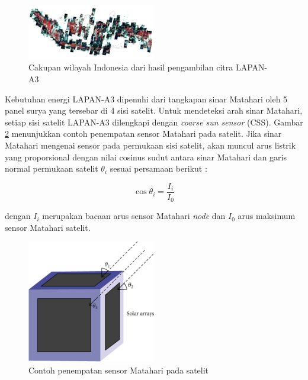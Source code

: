 \begin{figure}[H]
\setlength{}
\begin{center}
\includegraphics[width=0.5\textwidth]{fig/coverage.png}
	\caption[Cakupan wilayah Indonesia dari hasil pengambilan citra LAPAN-A3]{Cakupan wilayah Indonesia dari hasil pengambilan citra LAPAN-A3~\cite{hakim2018}}
\label{fig:coverage}
\end{center}
\end{figure}

Kebutuhan energi LAPAN-A3 dipenuhi dari tangkapan sinar Matahari oleh 5 panel
surya yang tersebar di 4 sisi satelit. Untuk mendeteksi arah sinar Matahari,
setiap sisi satelit LAPAN-A3 dilengkapi dengan \textit{coarse sun sensor}
(CSS). Gambar \ref{fig:css} menunjukkan contoh penempatan sensor Matahari pada
satelit. Jika sinar Matahari mengenai sensor pada permukaan sisi satelit, akan
muncul arus listrik yang proporsional dengan nilai cosinus sudut antara sinar
Matahari dan garis normal permukaan satelit $\theta_i$ sesuai persamaan berikut
\cite{zahran2009}:

\begin{equation}
\label{eq:current}
	\cos{\theta_i} = \frac{I_i}{I_0}
\end{equation}

dengan $I_i$ merupakan bacaan arus sensor Matahari \textit{node} dan $I_0$ arus
maksimum sensor Matahari satelit.

\begin{figure}[H]
\setlength{}
\begin{center}
\includegraphics[width=0.5\textwidth]{fig/css.png}
	\caption[Contoh penempatan sensor Matahari pada satelit]{Contoh penempatan sensor Matahari pada satelit~\cite{post2013}}
\label{fig:css}
\end{center}
\end{figure}

